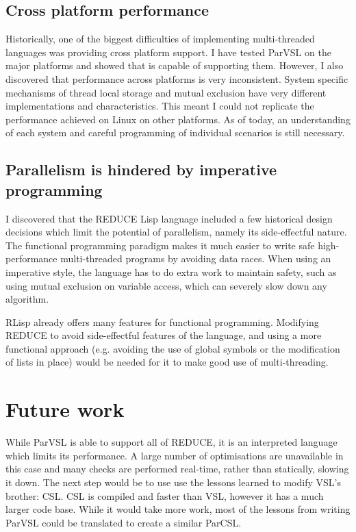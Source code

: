 \subsection{Cross platform performance}

Historically, one of the biggest difficulties of implementing multi-threaded languages
was providing cross platform support. I have tested ParVSL on the major platforms and
showed that is capable of supporting them. However, I also discovered that performance
across platforms is very inconsistent. System specific mechanisms of thread local storage
and mutual exclusion have very different implementations and characteristics. This meant
I could not replicate the performance achieved on Linux on other platforms. As of today,
an understanding of each system and careful programming of individual scenarios is still
necessary.

\subsection{Parallelism is hindered by imperative programming}

I discovered that the REDUCE Lisp language included a few historical design decisions which
limit the potential of parallelism, namely its side-effectful nature. The functional programming
paradigm makes it much easier to write safe high-performance multi-threaded programs by avoiding
data races. When using an imperative style, the language has to do extra work to maintain safety,
such as using mutual exclusion on variable access, which can severely slow down any algorithm.

RLisp already offers many features for functional programming.
Modifying REDUCE to avoid side-effectful features of the language, and using a more
functional approach (e.g. avoiding the use of global symbols or the modification
of lists in place) would be needed for it to make good use of multi-threading.

\section{Future work}

While ParVSL is able to support all of REDUCE, it is an interpreted language
which limits its performance. A large number of optimisations are unavailable in this
case and many checks are performed real-time, rather than statically, slowing it down.
The next step would be to use use the lessons learned to modify VSL's brother: CSL.
CSL is compiled and faster than VSL, however it has a much larger code base.
While it would take more work, most of the lessons from writing ParVSL could be translated
to create a similar ParCSL.

